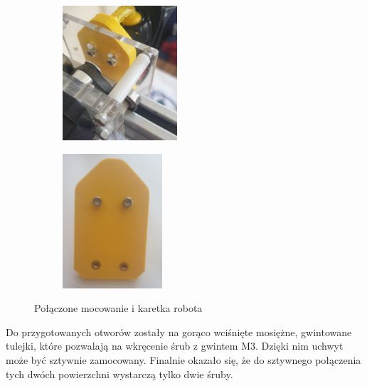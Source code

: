 \begin{figure}[H]
	\centering
	\begin{subfigure}{}
		\includegraphics[height=5cm]{pages/dodatekARobot/img/mocownanieUchwytKaretka.jpg}
	\end{subfigure}
	\begin{subfigure}{}
		\includegraphics[height=5cm]{pages/dodatekARobot/img/mocowanieKameryTyl.jpg}
	\end{subfigure}
	\caption{Połączone mocowanie i karetka robota}
\end{figure}
Do przygotowanych otworów zostały na gorąco wciśnięte mosiężne, gwintowane tulejki, które pozwalają na wkręcenie śrub z gwintem M3.
Dzięki nim uchwyt może być sztywnie zamocowany.
Finalnie okazało się, że do sztywnego połączenia tych dwóch powierzchni wystarczą tylko dwie śruby.

